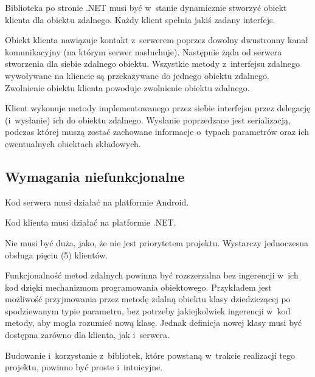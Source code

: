 \begin{description}

Biblioteka po stronie .NET musi być w~stanie dynamicznie stworzyć obiekt klienta dla obiektu zdalnego.
Każdy klient spełnia jakiś zadany interfejs.

Obiekt klienta nawiązuje kontakt z~serwerem poprzez dowolny dwustronny kanał komunikacyjny (na którym serwer nasłuchuje).
Następnie żąda od serwera stworzenia dla siebie zdalnego obiektu.
Wszystkie metody z~interfejsu zdalnego wywoływane na kliencie są przekazywane do jednego obiektu zdalnego.
Zwolnienie obiektu klienta powoduje zwolnienie obiektu zdalnego.

Klient wykonuje metody implementowanego przez siebie interfejsu przez delegację (i~wysłanie) ich do obiektu zdalnego.
Wysłanie poprzedzane jest serializacją, podczas której muszą zostać zachowane informacje o~typach parametrów oraz ich ewentualnych obiektach składowych.

\end{description}



\subsection{Wymagania niefunkcjonalne}

\begin{description}

Kod serwera musi działać na platformie Android.

Kod klienta musi działać na platformie .NET\@.

Nie musi być duża, jako, że nie jest priorytetem projektu. Wystarczy jednoczesna obsługa pięciu (5) klientów.

Funkcjonalność metod zdalnych powinna być rozszerzalna bez ingerencji w~ich kod dzięki mechanizmom programowania obiektowego.
Przykładem jest możliwość przyjmowania przez metodę zdalną obiektu klasy dziedziczącej po spodziewanym typie parametru, bez potrzeby jakiejkolwiek ingerencji w~kod metody, aby mogła rozumieć nową klasę.
Jednak definicja nowej klasy musi być dostępna zarówno dla klienta, jak i~serwera.

Budowanie i~korzystanie z~bibliotek, które powstaną w~trakcie realizacji tego projektu, powinno być proste i~intuicyjne.

\end{description}




